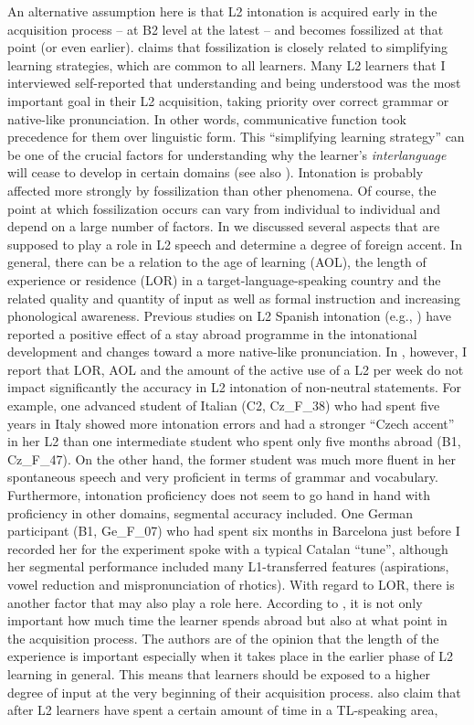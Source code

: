 An alternative assumption here is that L2 intonation is acquired early in the acquisition process -- at B2 level at the latest -- and becomes fossilized at that point (or even earlier). \citet{Sims1989} claims that fossilization is closely related to simplifying learning strategies, which are common to all learners. Many L2 learners that I interviewed self-reported that understanding and being understood was the most important goal in their L2 acquisition, taking priority over correct grammar or native-like pronunciation. In other words, communicative function took precedence for them over linguistic form. This “simplifying learning strategy” can be one of the crucial factors for understanding why the learner’s \textit{interlanguage} will cease to develop in certain domains (see also \citealt{Corder1967, Selinker1993}). Intonation is probably affected more strongly by fossilization than other phenomena. Of course, the point at which fossilization occurs can vary from individual to individual and depend on a large number of factors. In  we discussed several aspects that are supposed to play a role in L2 speech and determine a degree of foreign accent. In general, there can be a relation to the age of learning (AOL), the length of experience or residence (LOR) in a target-language-speaking country and the related quality and quantity of input as well as formal instruction and increasing phonological awareness. Previous studies on L2 Spanish intonation (e.g., \citealt{HenriksenEtAl2010, Trimble2013, Craft2015}) have reported a positive effect of a stay abroad programme in the intonational development and changes toward a more native-like pronunciation. In \citet{Pešková2022b}, however, I report that LOR, AOL and the amount of the active use of a L2 per week do not impact significantly the accuracy in L2 intonation of non-neutral statements. For example, one advanced student of Italian (C2, Cz\_F\_38) who had spent five years in Italy showed more intonation errors and had a stronger “Czech accent” in her L2 than one intermediate student who spent only five months abroad (B1, Cz\_F\_47). On the other hand, the former student was much more fluent in her spontaneous speech and very proficient in terms of grammar and vocabulary. Furthermore, intonation proficiency does not seem to go hand in hand with proficiency in other domains, segmental accuracy included. One German participant (B1, Ge\_F\_07) who had spent six months in Barcelona just before I recorded her for the experiment spoke with a typical Catalan “tune”, although her segmental performance included many L1-transferred features (aspirations, vowel reduction and mispronunciation of rhotics). With regard to LOR, there is another factor that may also play a role here. According to \citet{PiskeEtAl2001}, it is not only important how much time the learner spends abroad but also at what point in the acquisition process. The authors are of the opinion that the length of the experience is important especially when it takes place in the earlier phase of L2 learning in general. This means that learners should be exposed to a higher degree of input at the very beginning of their acquisition process. \citet[210]{PiskeEtAl2001} also claim that after L2 learners have spent a certain amount of time in a TL-speaking area, 